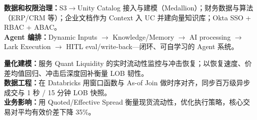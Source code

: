 \documentclass[letterpaper]{deedy-resume}
\renewcommand{\runsubsection}[1]{%
\color{subheadings}\fontsize{12pt}{12pt}\selectfont\bfseries #1\normalfont}
\renewcommand{\descript}[1]{%
\color{subheadings}\raggedright\fontsize{11pt}{13pt}\selectfont {#1 \\}\normalfont}
\renewcommand{\location}[1]{%
\color{headings}\raggedright\fontsize{10pt}{12pt}\selectfont {#1\\}\normalfont}
\begin{document}
\begin{minipage}[t]{0.66\textwidth}
\runsubsection{}
\descript{企业级 Databricks Lakehouse 与多 Agent 平台}
\location{2026年2月 -- 2026年7月 $|$ BitMart}
\textbf{数据和权限治理：}S3$\to$Unity Catalog 接入与建模（Medallion）；财务数据与算法（ERP/CRM 等）；企业文档作为 Context 入 UC 并建向量知识库；Okta SSO + RBAC + ABAC。 \\
\textbf{Agent 编排：}Dynamic Inputs $\to$ Knowledge/Memory $\to$ AI processing $\to$ Lark Execution $\to$ HITL eval/write-back---闭环、可自学习的 Agent 系统。

\sectionspace

\runsubsection{}
\descript{高频流动性与有效价差分析平台}
\location{2025年7月 -- 2026年3月 $|$ BitMart}
\textbf{量化建模：}服务 Quant Liquidity 的实时流动性监控与冲击恢复；以恢复速度、价差均值回归、冲击后深度回补衡量 LOB 韧性。 \\
\textbf{数据工程：}在 Databricks 用窗口函数与 As-of Join 做时序对齐，同步百万级异步成交与 1 秒 / 15 分钟 LOB 快照。 \\
\textbf{业务影响：}用 Quoted/Effective Spread 衡量现货流动性，优化执行策略，核心交易对平均有效价差下降 35\%。

\end{minipage}
\end{document}
